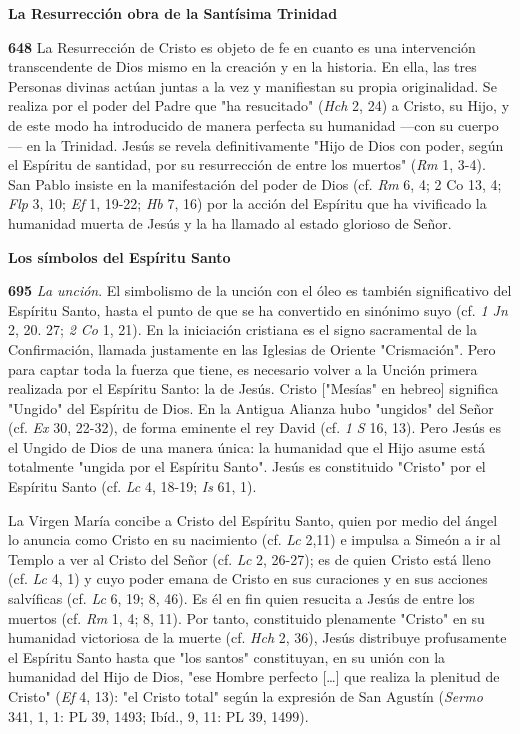 \documentclass[]{article}
\begin{document}
\textbf{La Resurrección obra de la Santísima Trinidad}

\textbf{648} La Resurrección de Cristo es objeto de fe en cuanto es una
intervención transcendente de Dios mismo en la creación y en la
historia. En ella, las tres Personas divinas actúan juntas a la vez y
manifiestan su propia originalidad. Se realiza por el poder del Padre
que "ha resucitado" (\emph{Hch} 2, 24) a Cristo, su Hijo, y de este modo
ha introducido de manera perfecta su humanidad ---con su cuerpo--- en la
Trinidad. Jesús se revela definitivamente "Hijo de Dios con poder, según
el Espíritu de santidad, por su resurrección de entre los muertos"
(\emph{Rm} 1, 3-4). San Pablo insiste en la manifestación del poder de
Dios (cf. \emph{Rm} 6, 4; 2 Co 13, 4; \emph{Flp} 3, 10; \emph{Ef} 1,
19-22; \emph{Hb} 7, 16) por la acción del Espíritu que ha vivificado la
humanidad muerta de Jesús y la ha llamado al estado glorioso de Señor.

\textbf{Los símbolos del Espíritu Santo}

\textbf{695} \emph{La unción}. El simbolismo de la unción con el óleo es
también significativo del Espíritu Santo, hasta el punto de que se ha
convertido en sinónimo suyo (cf. \emph{1 Jn} 2, 20. 27; \emph{2 Co} 1,
21). En la iniciación cristiana es el signo sacramental de la
Confirmación, llamada justamente en las Iglesias de Oriente
"Crismación". Pero para captar toda la fuerza que tiene, es necesario
volver a la Unción primera realizada por el Espíritu Santo: la de Jesús.
Cristo {[}"Mesías" en hebreo{]} significa "Ungido" del Espíritu de Dios.
En la Antigua Alianza hubo "ungidos" del Señor (cf. \emph{Ex} 30,
22-32), de forma eminente el rey David (cf. \emph{1 S} 16, 13). Pero
Jesús es el Ungido de Dios de una manera única: la humanidad que el Hijo
asume está totalmente "ungida por el Espíritu Santo". Jesús es
constituido "Cristo" por el Espíritu Santo (cf. \emph{Lc} 4, 18-19;
\emph{Is} 61, 1).

La Virgen María concibe a Cristo del Espíritu Santo, quien por medio del
ángel lo anuncia como Cristo en su nacimiento (cf. \emph{Lc} 2,11) e
impulsa a Simeón a ir al Templo a ver al Cristo del Señor (cf. \emph{Lc}
2, 26-27); es de quien Cristo está lleno (cf. \emph{Lc} 4, 1) y cuyo
poder emana de Cristo en sus curaciones y en sus acciones salvíficas
(cf. \emph{Lc} 6, 19; 8, 46). Es él en fin quien resucita a Jesús de
entre los muertos (cf. \emph{Rm} 1, 4; 8, 11). Por tanto, constituido
plenamente "Cristo" en su humanidad victoriosa de la muerte (cf.
\emph{Hch} 2, 36), Jesús distribuye profusamente el Espíritu Santo hasta
que "los santos" constituyan, en su unión con la humanidad del Hijo de
Dios, "ese Hombre perfecto [\ldots{}] que realiza la plenitud de Cristo"
(\emph{Ef} 4, 13): "el Cristo total" según la expresión de San Agustín
(\emph{Sermo} 341, 1, 1: PL 39, 1493; Ibíd., 9, 11: PL 39, 1499).
\end{document}
